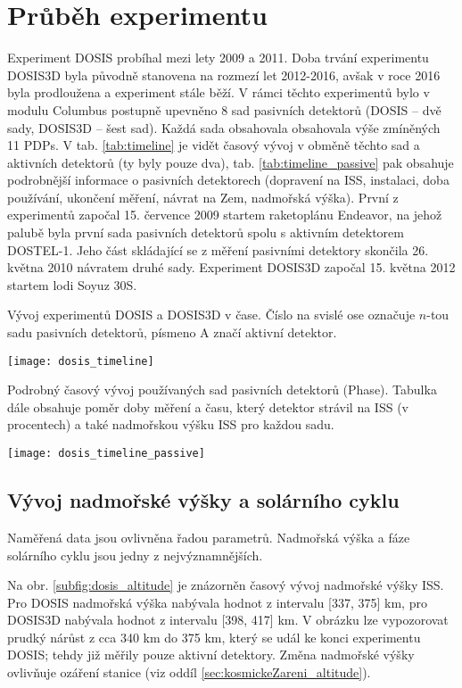 \section{Průběh experimentu}
Experiment DOSIS probíhal mezi lety 2009 a 2011. Doba trvání experimentu DOSIS3D byla původně stanovena na rozmezí let 2012-2016, avšak v roce 2016 byla prodloužena a experiment stále běží. V rámci těchto experimentů bylo v modulu Columbus postupně upevněno 8 sad pasivních detektorů (DOSIS -- dvě sady, DOSIS3D -- šest sad). Každá sada obsahovala obsahovala výše zmíněných 11 PDPs. V tab. \ref{tab:timeline} je vidět časový vývoj v obměně těchto sad a aktivních detektorů (ty byly pouze dva), tab. \ref{tab:timeline_passive} pak obsahuje podrobnější informace o pasivních detektorech (dopravení na ISS, instalaci, doba používání, ukončení měření, návrat na Zem, nadmořská výška). První z experimentů započal 15. července 2009 startem raketoplánu Endeavor, na jehož palubě byla
první sada pasivních detektorů spolu s aktivním detektorem DOSTEL-1. Jeho část skládající se z měření pasivními detektory skončila 26. května 2010 návratem druhé sady. Experiment DOSIS3D započal 15. května 2012 startem lodi Soyuz 30S. 
\begin{table}[H]
  \centering
  \caption{Vývoj experimentů DOSIS a DOSIS3D v čase. Číslo na svislé ose označuje $n$-tou sadu pasivních detektorů, písmeno A značí aktivní detektor. \cite{dosis}}
  \label{tab:timeline}
  \texttt{[image: dosis\_timeline]}
\end{table}
\begin{table}[H]
  \centering
  \caption{Podrobný časový vývoj používaných sad pasivních detektorů (Phase). Tabulka dále obsahuje poměr doby měření a času, který detektor strávil na ISS (v procentech) a také nadmořskou výšku ISS pro každou sadu. \cite{dosis}}
  \label{tab:timeline_passive}
  \texttt{[image: dosis\_timeline\_passive]}
\end{table}

\subsection{Vývoj nadmořské výšky a solárního cyklu} %
Naměřená data jsou ovlivněna řadou parametrů. Nadmořská výška a fáze solárního cyklu jsou jedny z nejvýznamnějších. 

Na obr. \ref{subfig:dosis_altitude} je znázorněn časový vývoj nadmořské výšky ISS. Pro DOSIS nadmořská výška nabývala hodnot z intervalu [337, 375] km, pro DOSIS3D nabývala hodnot z intervalu [398, 417] km. V obrázku lze vypozorovat prudký nárůst z cca 340 km do 375 km, který se udál ke konci experimentu DOSIS; tehdy již měřily pouze aktivní detektory. Změna nadmořské výšky ovlivňuje ozáření stanice (viz oddíl \ref{sec:kosmickeZareni_altitude}). 


